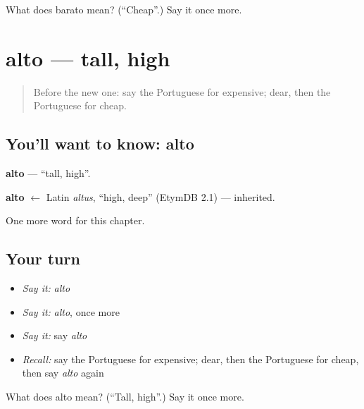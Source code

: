 \begin{tcolorbox}[breakable,colback=teal!4,colframe=teal!35!black,title={Before you move on}]
What does barato mean? (\textquotedblleft{}Cheap\textquotedblright{}.) Say it once more.
\end{tcolorbox}
\section[alto]{alto — tall, high}

\label{lesson:PT-C67-alto}



\begin{quote}
Before the new one: say the Portuguese for expensive; dear, then the Portuguese for cheap.
\end{quote}

\subsection*{You'll want to know: alto}
\textbf{alto} — \textquotedblleft{}tall, high\textquotedblright{}.

\begin{cousinweb}
\textbf{alto} $\leftarrow$ Latin \emph{altus}, \textquotedblleft{}high, deep\textquotedblright{} (EtymDB 2.1) — inherited.
\end{cousinweb}

\begin{grammarlens}[title={What you've built}]
One more word for this chapter.
\end{grammarlens}

\subsection*{Your turn}
\begin{itemize}
\raggedright
  \item \emph{Say it:} \emph{alto}
  \item \emph{Say it:} \emph{alto}, once more
  \item \emph{Say it:} say \emph{alto}
  \item \emph{Recall:} say the Portuguese for expensive; dear, then the Portuguese for cheap, then say \emph{alto} again
\end{itemize}

\begin{tcolorbox}[breakable,colback=teal!4,colframe=teal!35!black,title={Before you move on}]
What does alto mean? (\textquotedblleft{}Tall, high\textquotedblright{}.) Say it once more.
\end{tcolorbox}
